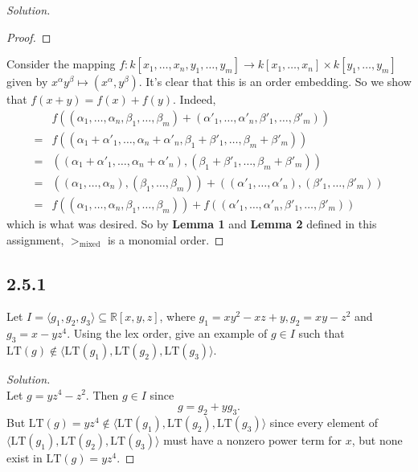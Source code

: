 \documentclass[]{article}
\newcommand\<{\langle}
\renewcommand\>{\rangle}
\newcommand{\RR}{\ensuremath{\mathbb{R}}}
\newenvironment{solution}
{
	\begin{proof}[Solution] \text{ }
		\\
	}
	{
	\end{proof}
}
\begin{document}
\begin{solution}
\begin{proof}
	\end{proof}
	Consider the mapping $f : k[x_1,\dots,x_n,y_1,\dots,y_m] \to k[x_1,\dots,x_n] \times k[y_1,\dots,y_m]$ given by $x^\alpha y^\beta \mapsto (x^\alpha, y^\beta)$. It's clear that this is an order embedding. So we show that $f(x + y) = f(x) + f(y)$. Indeed,
	\begin{align*}
		&f\left(\left(\alpha_1,\dots,\alpha_n,\beta_1,\dots,\beta_m\right) + \left(\alpha'_1,\dots,\alpha'_n,\beta'_1,\dots,\beta'_m\right)\right) \\
		= &f\left(\left(\alpha_1 + \alpha'_1,\dots,\alpha_n + \alpha'_n,\beta_1 + \beta'_1,\dots,\beta_m + \beta'_m\right)\right) \\
		= &\left(\left(\alpha_1 + \alpha'_1,\dots,\alpha_n + \alpha'_n\right), \left(\beta_1 + \beta'_1,\dots,\beta_m + \beta'_m\right)\right) \\
		= &\left(\left(\alpha_1,\dots,\alpha_n\right), \left(\beta_1,\dots,\beta_m\right)\right) + \left(\left(\alpha'_1,\dots,\alpha'_n\right), \left(\beta'_1,\dots,\beta'_m\right)\right) \\
		= &f\left(\left(\alpha_1,\dots,\alpha_n, \beta_1,\dots,\beta_m\right)\right) + f\left(\left(\alpha'_1,\dots,\alpha'_n, \beta'_1,\dots,\beta'_m\right)\right)
	\end{align*}
	which is what was desired. So by \textbf{Lemma 1} and \textbf{Lemma 2} defined in this assignment, $>_\text{mixed}$ is a monomial order.
\end{solution}

\subsection*{2.5.1} Let $I = \<g_1,g_2,g_3\> \subseteq \RR[x,y,z]$, where $g_1 = xy^2 - xz + y, g_2 = xy - z^2$ and $g_3 = x - yz^4$. Using the lex order, give an example of $g \in I$ such that $\text{LT}(g) \notin \<\text{LT}(g_1), \text{LT}(g_2), \text{LT}(g_3)\>$.
\begin{solution}
	Let $g = yz^4 - z^2$. Then $g \in I$ since
	$$
		g = g_2 + yg_3.
	$$
	But $\text{LT}(g) = yz^4 \notin \<\text{LT}(g_1), \text{LT}(g_2), \text{LT}(g_3)\>$ since every element of $\<\text{LT}(g_1), \text{LT}(g_2), \text{LT}(g_3)\>$ must have a nonzero power term for $x$, but none exist in $\text{LT}(g) = yz^4$.
\end{solution}
\end{document}
